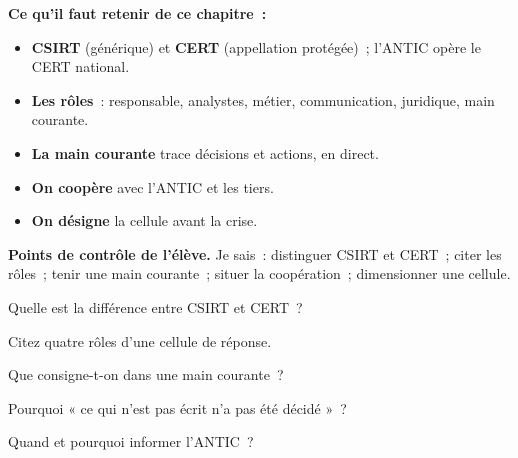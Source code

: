 \separateur

\begin{boxresume}
\textbf{Ce qu'il faut retenir de ce chapitre~:}
\begin{itemize}
    \item \textbf{CSIRT} (générique) et \textbf{CERT} (appellation
          protégée)~; l'ANTIC opère le CERT national.
    \item \textbf{Les rôles}~: responsable, analystes, métier, communication,
          juridique, main courante.
    \item \textbf{La main courante} trace décisions et actions, en direct.
    \item \textbf{On coopère} avec l'ANTIC et les tiers.
    \item \textbf{On désigne} la cellule avant la crise.
\end{itemize}
\end{boxresume}

\begin{boxinfo}
\textbf{Points de contrôle de l'élève.} Je sais~: distinguer CSIRT et CERT~;
citer les rôles~; tenir une main courante~; situer la coopération~;
dimensionner une cellule.
\end{boxinfo}

\bigskip

\begin{boxexo}[title={\ding{45}\quad Exercice~16.1. CSIRT ou CERT \niveaubase}]
Quelle est la différence entre CSIRT et CERT~?
\end{boxexo}

\begin{boxexo}[title={\ding{45}\quad Exercice~16.2. Rôles \niveaubase}]
Citez quatre rôles d'une cellule de réponse.
\end{boxexo}

\begin{boxexo}[title={\ding{45}\quad Exercice~16.3. Main courante \niveaubase}]
Que consigne-t-on dans une main courante~?
\end{boxexo}

\begin{boxexo}[title={\ding{45}\quad Exercice~16.4. Écrit \niveaumoyen}]
Pourquoi « ce qui n'est pas écrit n'a pas été décidé »~?
\end{boxexo}

\begin{boxexo}[title={\ding{45}\quad Exercice~16.5. ANTIC \niveaumoyen}]
Quand et pourquoi informer l'ANTIC~?
\end{boxexo}

